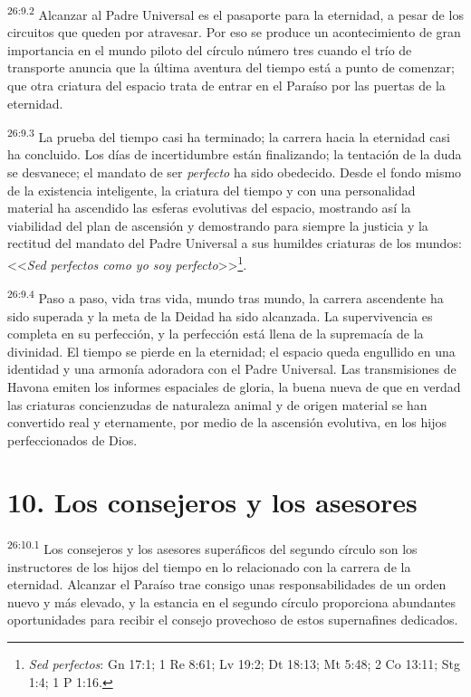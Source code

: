 \par
\textsuperscript{26:9.2} Alcanzar al Padre Universal es el pasaporte para la eternidad, a pesar de los circuitos que queden por atravesar. Por eso se produce un acontecimiento de gran importancia en el mundo piloto del círculo número tres cuando el trío de transporte anuncia que la última aventura del tiempo está a punto de comenzar; que otra criatura del espacio trata de entrar en el Paraíso por las puertas de la eternidad.

\par
\textsuperscript{26:9.3} La prueba del tiempo casi ha terminado; la carrera hacia la eternidad casi ha concluido. Los días de incertidumbre están finalizando; la tentación de la duda se desvanece; el mandato de ser \textit{perfecto} ha sido obedecido. Desde el fondo mismo de la existencia inteligente, la criatura del tiempo y con una personalidad material ha ascendido las esferas evolutivas del espacio, mostrando así la viabilidad del plan de ascensión y demostrando para siempre la justicia y la rectitud del mandato del Padre Universal a sus humildes criaturas de los mundos: <<\textit{Sed perfectos como yo soy perfecto}>>\footnote{\textit{Sed perfectos}: Gn 17:1; 1 Re 8:61; Lv 19:2; Dt 18:13; Mt 5:48; 2 Co 13:11; Stg 1:4; 1 P 1:16.}.

\par
\textsuperscript{26:9.4} Paso a paso, vida tras vida, mundo tras mundo, la carrera ascendente ha sido superada y la meta de la Deidad ha sido alcanzada. La supervivencia es completa en su perfección, y la perfección está llena de la supremacía de la divinidad. El tiempo se pierde en la eternidad; el espacio queda engullido en una identidad y una armonía adoradora con el Padre Universal. Las transmisiones de Havona emiten los informes espaciales de gloria, la buena nueva de que en verdad las criaturas concienzudas de naturaleza animal y de origen material se han convertido real y eternamente, por medio de la ascensión evolutiva, en los hijos perfeccionados de Dios.

\section*{10. Los consejeros y los asesores}
\par
\textsuperscript{26:10.1} Los consejeros y los asesores superáficos del segundo círculo son los instructores de los hijos del tiempo en lo relacionado con la carrera de la eternidad. Alcanzar el Paraíso trae consigo unas responsabilidades de un orden nuevo y más elevado, y la estancia en el segundo círculo proporciona abundantes oportunidades para recibir el consejo provechoso de estos supernafines dedicados.

